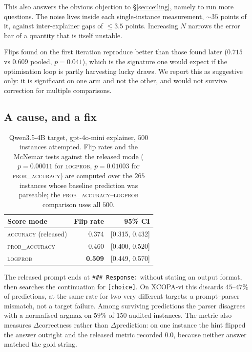 \documentclass[11pt]{article}
\begin{document}
This also answers the obvious objection to \S\ref{sec:ceiling}, namely to run
more questions. The noise lives inside each single-instance measurement, ${\sim}35$
points of it, against inter-explainer gaps of ${\le}3.5$ points. Increasing $N$
narrows the error bar of a quantity that is itself unstable.

Flips found on the first iteration reproduce better than those found later
($0.715$ vs $0.609$ pooled, $p=0.041$), which is the signature one would expect
if the optimisation loop is partly harvesting lucky draws. We report this as
suggestive only: it is significant on one arm and not the other, and would not
survive correction for multiple comparisons.

\subsection{A cause, and a fix}
\label{sec:parser}

\begin{table}[t]
\centering\small
\begin{tabular}{lrr}
\toprule
\textbf{Score mode} & \textbf{Flip rate} & \textbf{95\% CI} \\
\midrule
\textsc{accuracy} (released) & 0.374 & [0.315, 0.432] \\
\textsc{prob\_accuracy}      & 0.460 & [0.400, 0.520] \\
\textsc{logprob}             & \textbf{0.509} & [0.449, 0.570] \\
\bottomrule
\end{tabular}
\caption{Qwen3.5-4B target, gpt-4o-mini explainer, $500$ instances attempted.
Flip rates and the McNemar tests against the released mode ($p=0.00011$ for
\textsc{logprob}, $p=0.01003$ for \textsc{prob\_accuracy}) are computed over
the $265$ instances whose baseline prediction was parseable; the
\textsc{prob\_accuracy}--\textsc{logprob} comparison uses all $500$.}
\label{tab:modes}
\end{table}

The released prompt ends at \texttt{\#\#\# Response:} without stating an output
format, then searches the continuation for \texttt{[choice]\ldots@}. On XCOPA-vi
this discards $45$--$47\%$ of predictions, at the same rate for two very
different targets: a prompt--parser mismatch, not a target failure. Among
surviving predictions the parser disagrees with a normalised argmax on $59\%$ of
$150$ audited instances. The metric also measures $\Delta$correctness rather than
$\Delta$prediction: on one instance the hint flipped the answer outright and the
released metric recorded $0.0$, because neither answer matched the gold string.
\end{document}
